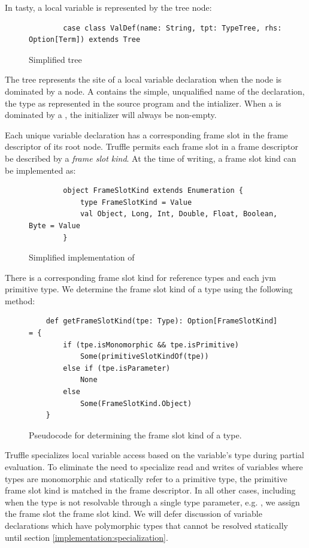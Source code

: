 In \acrshort{tasty}, a local variable is represented by the  tree node:

\begin{figure}[H]
	\begin{verbatim}
		case class ValDef(name: String, tpt: TypeTree, rhs: Option[Term]) extends Tree 
	\end{verbatim}
	\caption{Simplified  tree}
\end{figure}

The  tree represents the site of a local variable declaration when the node is dominated by a  node. 
A  contains the simple, unqualified name of the declaration, the type as represented in the source program and the intializer. 
When a  is dominated by a , the initializer will always be non-empty.

Each unique variable declaration has a corresponding frame slot in the frame descriptor of its root node. 
Truffle permits each frame slot in a frame descriptor be described by a \textit{frame slot kind}.
At the time of writing, a frame slot kind can be implemented as:

\begin{figure}[H]
	\begin{verbatim}
		object FrameSlotKind extends Enumeration {
			type FrameSlotKind = Value
			val Object, Long, Int, Double, Float, Boolean, Byte = Value
		}
	\end{verbatim}
	\caption{Simplified implementation of }
\end{figure}

There is a corresponding frame slot kind for reference types and each \acrshort{jvm} primitive type. 
We determine the frame slot kind of a type using the following method:

\begin{figure}[H]
	\begin{verbatim}
	def getFrameSlotKind(tpe: Type): Option[FrameSlotKind] = {
		if (tpe.isMonomorphic && tpe.isPrimitive)
			Some(primitiveSlotKindOf(tpe))
		else if (tpe.isParameter)
			None
		else
			Some(FrameSlotKind.Object)
	}	
	\end{verbatim}
	\caption{Pseudocode for determining the frame slot kind of a type.}
\end{figure}

Truffle specializes local variable access based on the variable's type during partial evaluation\cite{truffle:partial-eval}. 
To eliminate the need to specialize read and writes of variables where types are monomorphic and statically refer to a primitive type, the primitive frame slot kind is matched in the frame descriptor. 
In all other cases, including when the type is not resolvable through a single type parameter, e.g. , we assign the frame slot the  frame slot kind.
We will defer discussion of variable declarations which have polymorphic types that cannot be resolved statically until section \ref{implementation:specialization}.

